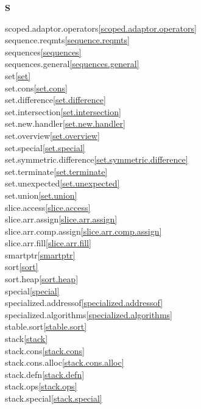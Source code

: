 \begin{multicols}{2}
\par \textbf{S}\par
scoped.adaptor.operators\quad\ref{scoped.adaptor.operators}\\
sequence.reqmts\quad\ref{sequence.reqmts}\\
sequences\quad\ref{sequences}\\
sequences.general\quad\ref{sequences.general}\\
set\quad\ref{set}\\
set.cons\quad\ref{set.cons}\\
set.difference\quad\ref{set.difference}\\
set.intersection\quad\ref{set.intersection}\\
set.new.handler\quad\ref{set.new.handler}\\
set.overview\quad\ref{set.overview}\\
set.special\quad\ref{set.special}\\
set.symmetric.difference\quad\ref{set.symmetric.difference}\\
set.terminate\quad\ref{set.terminate}\\
set.unexpected\quad\ref{set.unexpected}\\
set.union\quad\ref{set.union}\\
slice.access\quad\ref{slice.access}\\
slice.arr.assign\quad\ref{slice.arr.assign}\\
slice.arr.comp.assign\quad\ref{slice.arr.comp.assign}\\
slice.arr.fill\quad\ref{slice.arr.fill}\\
smartptr\quad\ref{smartptr}\\
sort\quad\ref{sort}\\
sort.heap\quad\ref{sort.heap}\\
special\quad\ref{special}\\
specialized.addressof\quad\ref{specialized.addressof}\\
specialized.algorithms\quad\ref{specialized.algorithms}\\
stable.sort\quad\ref{stable.sort}\\
stack\quad\ref{stack}\\
stack.cons\quad\ref{stack.cons}\\
stack.cons.alloc\quad\ref{stack.cons.alloc}\\
stack.defn\quad\ref{stack.defn}\\
stack.ops\quad\ref{stack.ops}\\
stack.special\quad\ref{stack.special}\\

\end{multicols}
